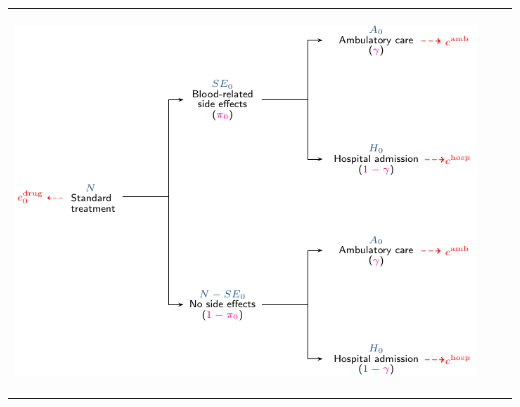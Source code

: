 {\begin{overprint}
\begin{tabular}{ccc}
\begin{minipage}[l]{5cm}
\begin{center}\includegraphics[scale=.37]{1.introduction-to-health-economic-evaluations/figs/ModelGraph2}\end{center}


\end{minipage}
\end{tabular}
\end{overprint}}
